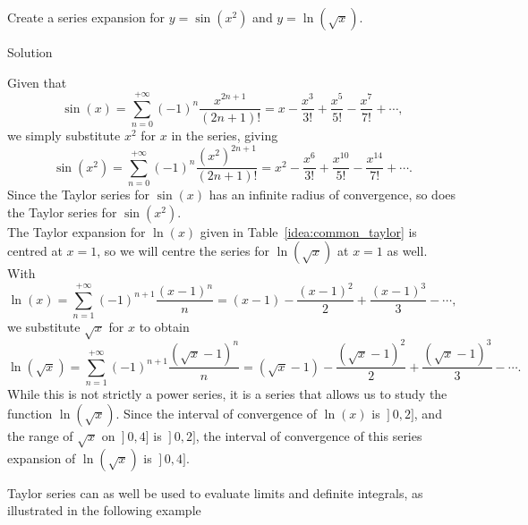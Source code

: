 \begin{example}\label{ex_ts6}
Create a series expansion for $y=\sin(x^2)$ and $y=\ln (\sqrt{x})$. 

Solution 

Given that 
$$\sin(x) = \sum_{n=0}^{+\infty} (-1)^n\frac{x^{2n+1}}{(2n+1)!} = x-\frac{x^3}{3!}+\frac{x^5}{5!} -\frac{x^7}{7!}+\cdots,$$
we simply substitute $x^2$ for $x$ in the series, giving
$$\sin (x^2) = \sum_{n=0}^{+\infty} (-1)^n\frac{(x^2)^{2n+1}}{(2n+1)!} = x^2-\frac{x^6}{3!}+\frac{x^{10}}{5!} -\frac{x^{14}}{7!}+\cdots.$$
Since the Taylor series for $\sin(x)$ has an infinite radius of convergence, so does the Taylor series for $\sin(x^2)$.\\

The Taylor expansion for $\ln(x)$ given in Table~\ref{idea:common_taylor} is centred at $x=1$, so we will centre the series for $\ln (\sqrt{x})$ at $x=1$ as well.
With 
$$\ln(x) = \sum_{n=1}^{+\infty}(-1)^{n+1}\frac{(x-1)^n}{n} = (x-1)- \frac{(x-1)^2}{2} +\frac{(x-1)^3}{3}-\cdots,$$
we substitute $\sqrt{x}$ for $x$ to obtain
$$\ln (\sqrt{x}) = \sum_{n=1}^{+\infty}(-1)^{n+1}\frac{(\sqrt{x}-1)^n}{n} = (\sqrt{x}-1)- \frac{(\sqrt{x}-1)^2}{2} +\frac{(\sqrt{x}-1)^3}{3}-\cdots.$$
While this is not strictly a power series, it is a series that allows us to study the function $\ln(\sqrt{x})$. Since the interval of convergence of $\ln(x)$ is $\left.\right]0,2]$, and the range of $\sqrt{x}$ on $\left.\right]0,4]$ is $\left.\right]0,2]$, the interval of convergence of this series expansion of $\ln(\sqrt{x})$ is $\left.\right]0,4]$.
\end{example}

\ifanalysis

Taylor series can as well be used to evaluate limits and definite integrals, as illustrated in the following example

